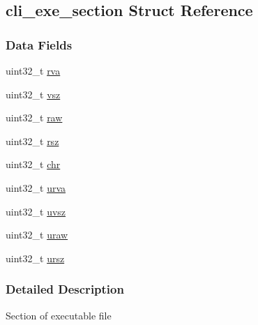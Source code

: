 \hypertarget{structcli__exe__section}{
\subsection{cli\_\-exe\_\-section Struct Reference}
\label{structcli__exe__section}
}
\subsubsection*{Data Fields}
\begin{DoxyCompactItemize}
\item 
uint32\_\-t \hyperlink{structcli__exe__section_a428af6b898632e49e1a78a6b75c35597}{rva}
\item 
uint32\_\-t \hyperlink{structcli__exe__section_a4e9a2c96ba84fd9dedbed61c9865cbc7}{vsz}
\item 
uint32\_\-t \hyperlink{structcli__exe__section_a0a595268561edc58e347ca8387000bc6}{raw}
\item 
uint32\_\-t \hyperlink{structcli__exe__section_a9d1a35dea930f9ddac78908ca3dce76b}{rsz}
\item 
uint32\_\-t \hyperlink{structcli__exe__section_a0737a11eee3c5a5d691fade6df9f5094}{chr}
\item 
uint32\_\-t \hyperlink{structcli__exe__section_a932862bb5ce030d0e6f007068e7817d6}{urva}
\item 
uint32\_\-t \hyperlink{structcli__exe__section_a4241ef43b0b01fea785fe76ba7054a37}{uvsz}
\item 
uint32\_\-t \hyperlink{structcli__exe__section_a1c392d2998c0846b21909814e4706a1e}{uraw}
\item 
uint32\_\-t \hyperlink{structcli__exe__section_a69f4a0067dad89980f815b5704f5f8da}{ursz}
\end{DoxyCompactItemize}


\subsubsection{Detailed Description}
Section of executable file 

